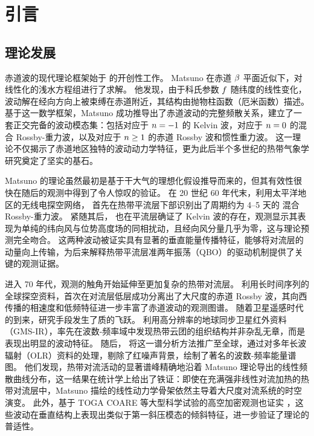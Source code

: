 \section{引言}
\label{sec:introduction}

\subsection{理论发展}

赤道波的现代理论框架始于 \citep{matsunoQuasiGeostrophicMotionsEquatorial1966} 的开创性工作。
Matsuno 在赤道 $\beta$ 平面近似下，对线性化的浅水方程组进行了求解。
他发现，由于科氏参数 $f$ 随纬度的线性变化，波动解在经向方向上被束缚在赤道附近，其结构由抛物柱函数（厄米函数）描述。
基于这一数学框架，Matsuno 成功推导出了赤道波动的完整频散关系，建立了一套正交完备的波动模态集：包括对应于 $n = -1$ 的 Kelvin 波，对应于 $n = 0$ 的混合 Rossby-重力波，以及对应于 $n \ge 1$ 的赤道 Rossby 波和惯性重力波。
这一理论不仅揭示了赤道地区独特的波动动力学特征，更为此后半个多世纪的热带气象学研究奠定了坚实的基石。

Matsuno 的理论虽然最初是基于干大气的理想化假设推导而来的，但其有效性很快在随后的观测中得到了令人惊叹的验证。
在 20 世纪 60 年代末，利用太平洋地区的无线电探空网络，\citep{Yanai1966} 首先在热带平流层下部识别出了周期约为 4--5 天的 混合 Rossby-重力波。
紧随其后，\citep{Wallace1968} 也在平流层确证了 Kelvin 波的存在，观测显示其表现为单纯的纬向风与位势高度场的同相扰动，且经向风分量几乎为零，这与理论预测完全吻合。
这两种波动被证实具有显著的垂直能量传播特征，能够将对流层的动量向上传输，为后来解释热带平流层准两年振荡（QBO）的驱动机制提供了关键的观测证据。

进入 70 年代，观测的触角开始延伸至更加复杂的热带对流层。
\citep{Madden1979} 利用长时间序列的全球探空资料，首次在对流层低层成功分离出了大尺度的赤道 Rossby 波，其向西传播的相速度和低频特征进一步丰富了赤道波动的观测图谱。
随着卫星遥感时代的到来，研究手段发生了质的飞跃。
\citep{Takayabu1994}利用高分辨率的地球同步卫星红外资料（GMS-IR），率先在波数-频率域中发现热带云团的组织结构并非杂乱无章，而是表现出明显的波动特征。
随后，\citep{Wheeler1999} 将这一谱分析方法推广至全球，通过对多年长波辐射（OLR）资料的处理，剔除了红噪声背景，绘制了著名的波数-频率能量谱图。
他们发现，热带对流活动的显著谱峰精确地沿着 Matsuno 理论导出的线性频散曲线分布，这一结果在统计学上给出了铁证：即使在充满强非线性对流加热的热带对流层中，Matsuno 描绘的线性动力学骨架依然主导着大尺度对流系统的时空演变。
此外，基于 TOGA COARE 等大型科学试验的高空加密观测也证实 \citep{kiladisConvectivelyCoupledEquatorial2009}，这些波动在垂直结构上表现出类似于第一斜压模态的倾斜特征，进一步验证了理论的普适性。

